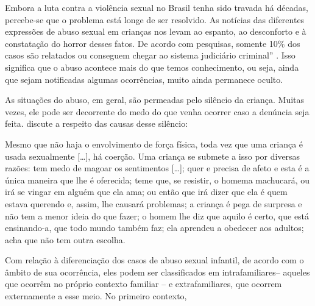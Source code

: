 
Embora a luta contra a violência sexual no Brasil tenha sido travada há décadas, percebe-se que o problema está longe de ser resolvido. As notícias das diferentes expressões de abuso sexual em crianças nos levam ao espanto, ao desconforto e à constatação do horror desses fatos. De acordo com pesquisas, somente 10\% dos casos são relatados ou conseguem chegar ao sistema judiciário criminal'' . Isso significa que o abuso acontece mais do que temos conhecimento, ou seja,  ainda que sejam notificadas algumas ocorrências, muito ainda permanece oculto.
	
As situações do abuso, em geral, são permeadas pelo silêncio da criança.  Muitas vezes, ele pode ser decorrente do medo do que venha ocorrer caso a denúncia  seja feita.  discute a respeito das causas desse silêncio:

\begin{citacao}
	Mesmo que não haja o envolvimento de força física, toda vez que uma criança é usada sexualmente [\ldots], há coerção. Uma criança se submete a isso por diversas razões: tem medo de magoar os sentimentos [\ldots]; quer e precisa de afeto e esta é a única maneira que lhe é oferecida; teme que, se resistir, o homem\footnotemark a machucará, ou irá se vingar em alguém que ela ama; ou então que irá dizer que ela é quem estava querendo e, assim, lhe causará problemas; a criança é pega de surpresa e não tem a menor ideia do que fazer; o homem lhe diz que aquilo é certo, que está ensinando-a, que todo mundo também faz; ela aprendeu a obedecer aos adultos; acha que não tem outra escolha.
\end{citacao}


Com relação à diferenciação dos casos de abuso sexual infantil, de acordo com o âmbito de sua ocorrência, eles podem ser classificados em intrafamiliares\footnotemark -- aqueles que ocorrêm no próprio contexto familiar -- e extrafamiliares, que ocorrem externamente a esse meio. No primeiro contexto, 

